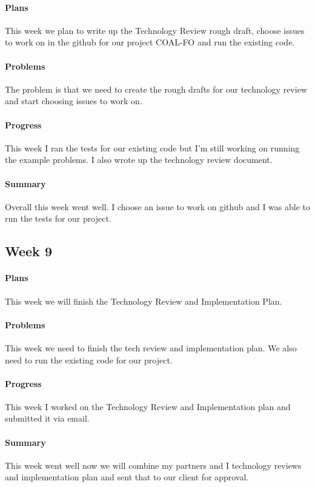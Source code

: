 \documentclass{article}
\begin{document}
\paragraph{Plans}
This week we plan to write up the Technology Review rough draft, choose issues to work on in the github for our project COAL-FO and run the existing code.
\paragraph{Problems}
The problem is that we need to create the rough drafts for our technology review and start choosing issues to work on. 
\paragraph{Progress}
This week I ran the tests for our existing code but I'm still working on running the example problems. I also wrote up the technology review document. 
\paragraph{Summary}
 Overall this week went well. I choose an issue to work on github and I was able to run the tests for our project. 
\subsection{Week 9}
\paragraph{Plans}
This week we will finish the Technology Review and Implementation Plan. 
\paragraph{Problems}
This week we need to finish the tech review and implementation plan. We also need to run the existing code for our project. 
\paragraph{Progress}
This week I worked on the Technology Review and Implementation plan and submitted it via email.
\paragraph{Summary}
This week went well now we will combine my partners and I technology reviews and implementation plan and sent that to our client for approval. 
\end{document}
